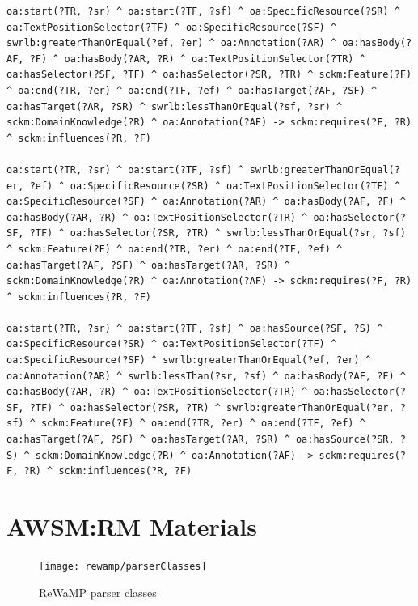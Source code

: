 \begin{appendix}
\begin{lstlisting}[language=turtle, captionpos=t, caption=SCKM Ontology SWRL Rules]
oa:start(?TR, ?sr) ^ oa:start(?TF, ?sf) ^ oa:SpecificResource(?SR) ^ oa:TextPositionSelector(?TF) ^ oa:SpecificResource(?SF) ^ swrlb:greaterThanOrEqual(?ef, ?er) ^ oa:Annotation(?AR) ^ oa:hasBody(?AF, ?F) ^ oa:hasBody(?AR, ?R) ^ oa:TextPositionSelector(?TR) ^ oa:hasSelector(?SF, ?TF) ^ oa:hasSelector(?SR, ?TR) ^ sckm:Feature(?F) ^ oa:end(?TR, ?er) ^ oa:end(?TF, ?ef) ^ oa:hasTarget(?AF, ?SF) ^ oa:hasTarget(?AR, ?SR) ^ swrlb:lessThanOrEqual(?sf, ?sr) ^ sckm:DomainKnowledge(?R) ^ oa:Annotation(?AF) -> sckm:requires(?F, ?R) ^ sckm:influences(?R, ?F)

oa:start(?TR, ?sr) ^ oa:start(?TF, ?sf) ^ swrlb:greaterThanOrEqual(?er, ?ef) ^ oa:SpecificResource(?SR) ^ oa:TextPositionSelector(?TF) ^ oa:SpecificResource(?SF) ^ oa:Annotation(?AR) ^ oa:hasBody(?AF, ?F) ^ oa:hasBody(?AR, ?R) ^ oa:TextPositionSelector(?TR) ^ oa:hasSelector(?SF, ?TF) ^ oa:hasSelector(?SR, ?TR) ^ swrlb:lessThanOrEqual(?sr, ?sf) ^ sckm:Feature(?F) ^ oa:end(?TR, ?er) ^ oa:end(?TF, ?ef) ^ oa:hasTarget(?AF, ?SF) ^ oa:hasTarget(?AR, ?SR) ^ sckm:DomainKnowledge(?R) ^ oa:Annotation(?AF) -> sckm:requires(?F, ?R) ^ sckm:influences(?R, ?F)

oa:start(?TR, ?sr) ^ oa:start(?TF, ?sf) ^ oa:hasSource(?SF, ?S) ^ oa:SpecificResource(?SR) ^ oa:TextPositionSelector(?TF) ^ oa:SpecificResource(?SF) ^ swrlb:greaterThanOrEqual(?ef, ?er) ^ oa:Annotation(?AR) ^ swrlb:lessThan(?sr, ?sf) ^ oa:hasBody(?AF, ?F) ^ oa:hasBody(?AR, ?R) ^ oa:TextPositionSelector(?TR) ^ oa:hasSelector(?SF, ?TF) ^ oa:hasSelector(?SR, ?TR) ^ swrlb:greaterThanOrEqual(?er, ?sf) ^ sckm:Feature(?F) ^ oa:end(?TR, ?er) ^ oa:end(?TF, ?ef) ^ oa:hasTarget(?AF, ?SF) ^ oa:hasTarget(?AR, ?SR) ^ oa:hasSource(?SR, ?S) ^ sckm:DomainKnowledge(?R) ^ oa:Annotation(?AF) -> sckm:requires(?F, ?R) ^ sckm:influences(?R, ?F)
\end{lstlisting}

\chapter{AWSM:RM Materials}

\begin{figure}[h]
	\centering
	\texttt{[image: rewamp/parserClasses]}
	\caption{ReWaMP \cpp parser classes}
	\label{fig:rewamp-parser}
\end{figure}


\end{appendix}
